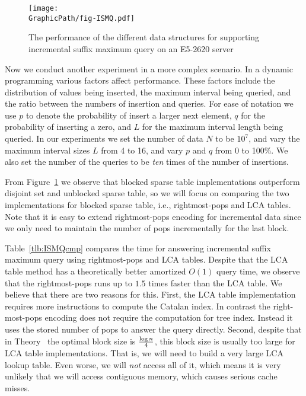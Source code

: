 \begin{figure}[!thb]
  \centering
  \texttt{[image: \\GraphicPath/fig-ISMQ.pdf]}
  \caption{The performance of the different data structures for
    supporting incremental suffix maximum query on an E5-2620 server}
  \label{fig:fig-ISMQcmp}
\end{figure}

Now we conduct another experiment in a more complex scenario.  In a
dynamic programming various factors affect performance.  These factors
include the distribution of values being inserted, the maximum
interval being queried, and the ratio between the numbers of insertion
and queries.  For ease of notation we use $p$ to denote the
probability of insert a larger next element, $q$ for the probability
of inserting a zero, and $L$ for the maximum interval length being
queried.  In our experiments we set the number of data $N$ to be
$10^7$, and vary the maximum interval sizes $L$ from 4 to 16, and vary
$p$ and $q$ from 0 to 100\%.  We also set the number of the queries to
be {\em ten} times of the number of insertions.

From Figure~\ref{fig:fig-ISMQcmp} we observe that blocked sparse table
implementations outperform disjoint set and unblocked sparse table, so
we will focus on comparing the two implementations for blocked sparse
table, i.e., rightmost-pops and LCA tables.  Note that it is easy to
extend rightmost-pops encoding for incremental data since we only need
to maintain the number of pops incrementally for the last block.

Table~\ref{tlb:ISMQcmp} compares the time for answering incremental
suffix maximum query using rightmost-pops and LCA tables.  Despite
that the LCA table method has a theoretically better amortized $O(1)$
query time, we observe that the rightmost-pops runs up to $1.5$ times
faster than the LCA table.  We believe that there are two reasons for
this.  First, the LCA table implementation requires more instructions
to compute the Catalan index.  In contrast the right-most-pops
encoding does not require the computation for tree index.  Instead it
uses the stored number of pops to answer the query directly.  Second,
despite that in Theory~\cite{Fischer2006TheoreticalAP} the optimal
block size is ${\log n}\over{4}$, this block size is usually too large
for LCA table implementations.  That is, we will need to build a very
large LCA lookup table.  Even worse, we will {\em not} access all of
it, which means it is very unlikely that we will access contiguous
memory, which causes serious cache misses.


